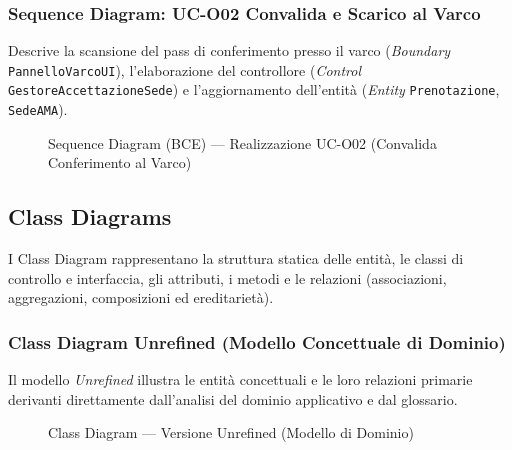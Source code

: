 \clearpage
\subsubsection{Sequence Diagram: UC-O02 Convalida e Scarico al Varco}
Descrive la scansione del pass di conferimento presso il varco (\textit{Boundary} \texttt{PannelloVarcoUI}), l'elaborazione del controllore (\textit{Control} \texttt{GestoreAccettazioneSede}) e l'aggiornamento dell'entità (\textit{Entity} \texttt{Prenotazione}, \texttt{SedeAMA}).

\begin{figure}[htbp]
    \centering
    \caption{Sequence Diagram (BCE) --- Realizzazione UC-O02 (Convalida Conferimento al Varco)}
    \label{fig:seq_conferimento}
\end{figure}

\newpage
\subsection{Class Diagrams}
I Class Diagram rappresentano la struttura statica delle entità, le classi di controllo e interfaccia, gli attributi, i metodi e le relazioni (associazioni, aggregazioni, composizioni ed ereditarietà).

\clearpage
\subsubsection{Class Diagram Unrefined (Modello Concettuale di Dominio)}
Il modello \textit{Unrefined} illustra le entità concettuali e le loro relazioni primarie derivanti direttamente dall'analisi del dominio applicativo e dal glossario.

\begin{figure}[htbp]
    \centering
    \caption{Class Diagram --- Versione Unrefined (Modello di Dominio)}
    \label{fig:class_unrefined}
\end{figure}

